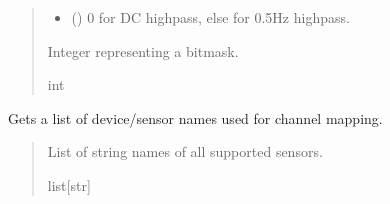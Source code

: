 \documentclass[letterpaper,10pt,english]{sphinxmanual}
\begin{document}
\begin{fulllineitems}
\begin{fulllineitems}
\begin{quote}
\begin{description}
\begin{itemize}
\item {} 
\sphinxAtStartPar
{} () \textendash{} 0 for DC highpass, else for 0.5Hz highpass.

\end{itemize}

\sphinxAtStartPar
Integer representing a bitmask.

\sphinxAtStartPar
int

\end{description}\end{quote}

\end{fulllineitems}


\begin{fulllineitems}
\label{\detokenize{PodApi.Devices:PodApi.Devices.PodDevice_8401HR.Pod8401HR.GetSupportedPreampDevices}}
\pysigstartsignatures
{}
\pysigstopsignatures
\sphinxAtStartPar
Gets a list of device/sensor names used for channel mapping.
\begin{quote}\begin{description}
\sphinxAtStartPar
List of string names of all supported sensors.

\sphinxAtStartPar
list{[}str{]}

\end{description}\end{quote}

\end{fulllineitems}



\end{fulllineitems}
\end{document}
